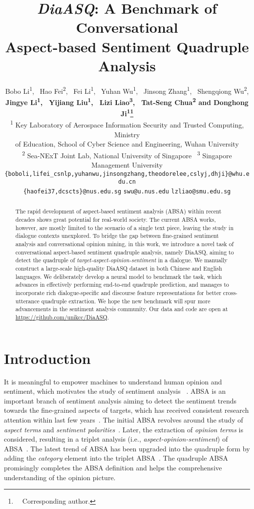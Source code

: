 \documentclass[11pt]{article}
\title{\textit{DiaASQ}\mlogo: A Benchmark of Conversational\\ Aspect-based Sentiment Quadruple Analysis}
\author{
Bobo Li\textsuperscript{\rm 1}, \,
Hao Fei\textsuperscript{\rm 2},  \,
Fei Li\textsuperscript{\rm 1}, \,
Yuhan Wu\textsuperscript{\rm 1}, \,
Jinsong Zhang\textsuperscript{\rm 1}, \,
Shengqiong Wu\textsuperscript{\rm 2}, \\
\textbf{
Jingye Li\textsuperscript{\rm 1},  \,
Yijiang Liu\textsuperscript{\rm 1},  \,
Lizi Liao\textsuperscript{\rm 3},  \,
Tat-Seng Chua\textsuperscript{\rm 2} and Donghong Ji\textsuperscript{\rm 1}\thanks{\ \ Corresponding author.}
}\\
\textsuperscript{\rm 1} Key Laboratory of Aerospace Information Security and Trusted Computing, Ministry  \\of Education,
School of Cyber Science and Engineering, Wuhan University \\
\textsuperscript{\rm 2} Sea-NExT Joint Lab, National University of Singapore \, 
\textsuperscript{\rm 3} Singapore Management University 
\\
\texttt{\{boboli,lifei\_csnlp,yuhanwu,jinsongzhang,theodorelee,cslyj,dhji\}@whu.edu.cn}
\\
\texttt{\{haofei37,dcscts\}@nus.edu.sg}\quad
\texttt{swu@u.nus.edu}\quad
\texttt{lzliao@smu.edu.sg}
}
\begin{document}
\maketitle
\begin{abstract}
The rapid development of aspect-based sentiment analysis (ABSA) within recent decades shows great potential for real-world society.
The current ABSA works, however, are mostly limited to the scenario of a single text piece, leaving the study in dialogue contexts unexplored.
To bridge the gap between fine-grained sentiment analysis and conversational opinion mining, in this work, we introduce a novel task of conversational aspect-based sentiment quadruple analysis, namely DiaASQ, aiming to detect the quadruple of \emph{target-aspect-opinion-sentiment} in a dialogue.
We manually construct a large-scale high-quality DiaASQ dataset in both Chinese and English languages.
We deliberately develop a neural model to benchmark the task, which advances in effectively performing end-to-end quadruple prediction, and manages to incorporate rich dialogue-specific and discourse feature representations for better cross-utterance quadruple extraction.
We hope the new benchmark will spur more advancements in the sentiment analysis community.
Our data and code are open at \url{https://github.com/unikcc/DiaASQ}.
\end{abstract}

\section{Introduction}
It is meaningful to empower machines to understand human opinion and sentiment, which motivates the study of sentiment analysis ~\cite{PangL07,mcdonald-etal-2007-structured,RenZZJ16,Cambria16}.
ABSA is an important branch of sentiment analysis aiming to detect the sentiment trends towards the fine-grained aspects of targets, which has received consistent research attention within last few years~\cite{LiBLLY18, fan-etal-2019-target, ChenLWZC20, Wu0RJL21, ChenZFLW22}.
The initial ABSA revolves around the study of \emph{aspect terms} and \emph{sentiment polarities}~\cite{tang-etal-2016-effective, FanFZ18,li2021unified}.
Later, the extraction of \emph{opinion terms} is considered, resulting in a triplet analysis (i.e., \emph{aspect-opinion-sentiment}) of ABSA~\cite{PengXBHLS20, ChenHLSJ21}.
The latest trend of ABSA has been upgraded into the quadruple form by adding the \emph{category} element into the triplet ABSA~\cite{CaiXY20, ZhangD0YBL21}.
The quadruple ABSA promisingly completes the ABSA definition and helps the comprehensive understanding of the opinion picture.
\end{document}
